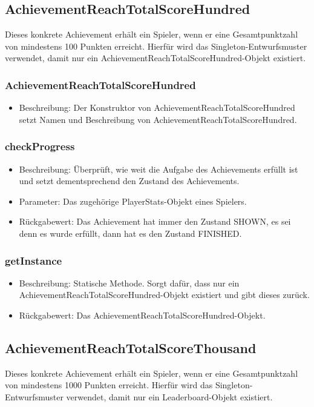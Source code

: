 \documentclass[a4paper]{scrreprt}
\begin{document}
    \subsection{AchievementReachTotalScoreHundred}
    Dieses konkrete Achievement erhält ein Spieler, wenn er eine Gesamtpunktzahl von mindestens 100 Punkten erreicht. Hierfür wird das Singleton-Entwurfsmuster verwendet, damit nur ein AchievementReachTotalScoreHundred-Objekt existiert.

    \subsubsection{AchievementReachTotalScoreHundred}
    \begin{itemize}
        \item Beschreibung: Der Konstruktor von AchievementReachTotalScoreHundred setzt Namen und Beschreibung von AchievementReachTotalScoreHundred.
    \end{itemize}
    \subsubsection{checkProgress}
    \begin{itemize}
        \item Beschreibung: Überprüft, wie weit die Aufgabe des Achievements erfüllt ist und setzt dementsprechend den Zustand des Achievements.
        \item Parameter: Das zugehörige PlayerStats-Objekt eines Spielers.
        \item Rückgabewert: Das Achievement hat immer den Zustand SHOWN, es sei denn es wurde erfüllt, dann hat es den Zustand FINISHED.
    \end{itemize}
    \subsubsection{getInstance}
    \begin{itemize}
        \item Beschreibung: Statische Methode. Sorgt dafür, dass nur ein AchievementReachTotalScoreHundred-Objekt existiert und gibt dieses zurück.
        \item Rückgabewert: Das AchievementReachTotalScoreHundred-Objekt.
    \end{itemize}

    \subsection{AchievementReachTotalScoreThousand}
    Dieses konkrete Achievement erhält ein Spieler, wenn er eine Gesamtpunktzahl von mindestens 1000 Punkten erreicht. Hierfür wird das Singleton-Entwurfsmuster verwendet, damit nur ein Leaderboard-Objekt existiert.
\end{document}
